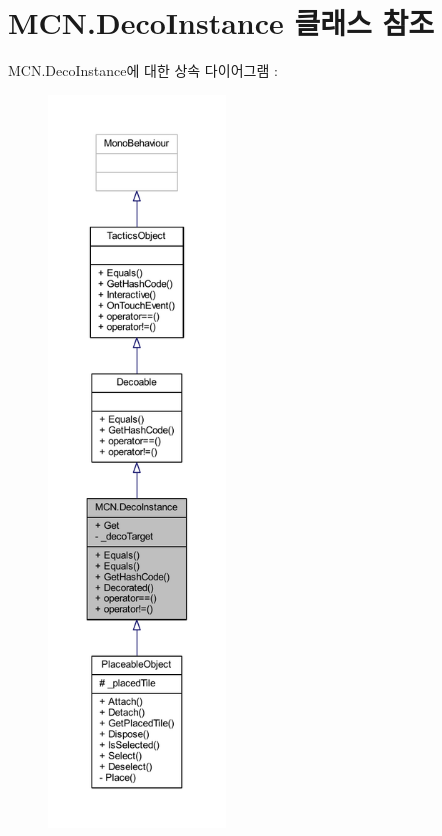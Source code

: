 \hypertarget{class_m_c_n_1_1_deco_instance}{}\section{M\+C\+N.\+Deco\+Instance 클래스 참조}
\label{class_m_c_n_1_1_deco_instance}


M\+C\+N.\+Deco\+Instance에 대한 상속 다이어그램 \+: \nopagebreak
\begin{figure}[H]
\begin{center}
\leavevmode
\includegraphics[height=550pt]{class_m_c_n_1_1_deco_instance__inherit__graph}
\end{center}
\end{figure}


